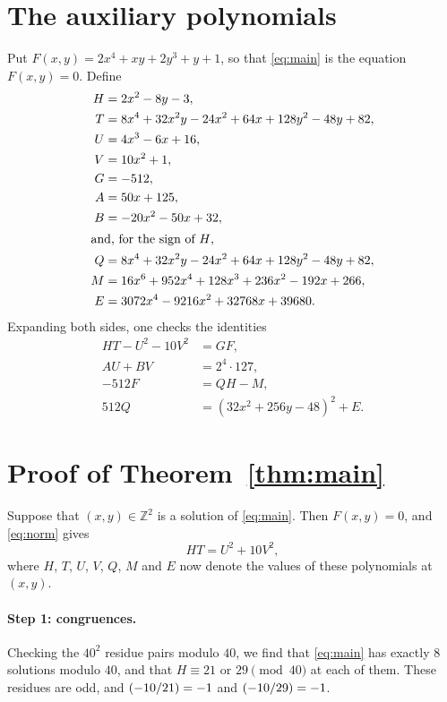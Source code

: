 \documentclass[11pt]{article}
\newcommand{\Z}{\mathbb{Z}}
\newcommand{\leg}[2]{\mathchoice{\biggl(\dfrac{#1}{#2}\biggr)}{(#1/#2)}{(#1/#2)}{(#1/#2)}}
\begin{document}
\section{The auxiliary polynomials}

Put $F(x,y)=2x^{4}+xy+2y^{3}+y+1$, so that \eqref{eq:main} is the equation $F(x,y)=0$. Define
\begin{align*}
H&=2x^{2}-8y-3,\\
T&=8x^{4}+32x^{2}y-24x^{2}+64x+128y^{2}-48y+82,\\
U&=4x^{3}-6x+16,\\
V&=10x^{2}+1,\\
G&=-512,\\
A&=50x+125,\\
B&=-20x^{2}-50x+32,\\
\intertext{and, for the sign of $H$,}
Q&=8x^{4}+32x^{2}y-24x^{2}+64x+128y^{2}-48y+82,\\
M&=16x^{6}+952x^{4}+128x^{3}+236x^{2}-192x+266,\\
E&=3072x^{4}-9216x^{2}+32768x+39680.
\end{align*}
Expanding both sides, one checks the identities
\begin{align}
HT-U^2-10V^2&=GF,\label{eq:norm}\\
AU+BV&=2^{4}\cdot 127,\label{eq:bezout}\\
-512F&=QH-M,\label{eq:sign}\\
512Q&=(32x^{2}+256y-48)^2+E.\label{eq:sign2}
\end{align}

\section{Proof of Theorem~\ref{thm:main}}

Suppose that $(x,y)\in\Z^2$ is a solution of \eqref{eq:main}. Then $F(x,y)=0$, and \eqref{eq:norm} gives
\begin{equation}\label{eq:HT}
HT=U^2+10V^2,
\end{equation}
where $H$, $T$, $U$, $V$, $Q$, $M$ and $E$ now denote the values of these polynomials at $(x,y)$.

\paragraph{Step 1: congruences.} Checking the $40^2$ residue pairs modulo $40$, we find that \eqref{eq:main} has exactly 8 solutions modulo $40$, and that $H\equiv21\text{ or }29\pmod{40}$ at each of them. These residues are odd, and $\leg{-10}{21}=-1$ and $\leg{-10}{29}=-1$.
\end{document}
